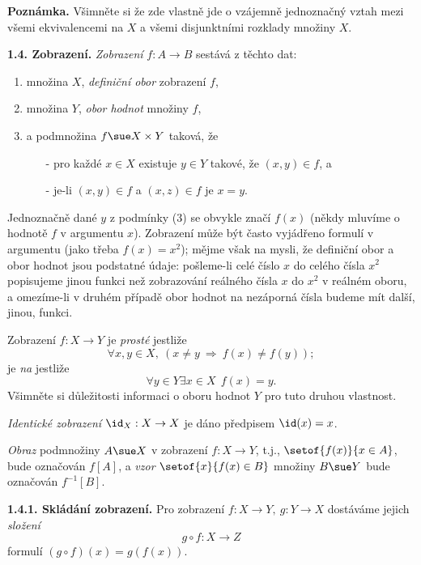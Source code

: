 \documentclass[12pt]{article}
\begin{document}
 \medskip
 
 {\bf  Poznámka.} Všimněte si že zde vlastně jde o vzájemně jednoznačný vztah mezi všemi ekvivalencemi na  $X$ a všemi disjunktními rozklady množiny $X$.
 
 
 
 \bigskip
 
 {\bf 1.4. Zobrazení.}  {\em  Zobrazení} $f:A\to B$ sestává z těchto dat:
 \begin{enumerate}
 \item množina $X$,  {\em definiční obor} zobrazení $f$,
 \item množina $Y$,  {\em obor hodnot} množiny $f$,
 \item a podmnožina $f\sue X\times Y$ taková, že
  \begin{itemize}
  \item[-] pro každé $x\in X$ existuje $y\in Y$ takové, že $(x,y)\in f$, a
  \item[-] je-li $(x,y)\in f$ a $(x,z)\in f$ je $x=y$.
  \end{itemize}
\end{enumerate}  
Jednoznačně dané $y$ z podmínky (3) se obvykle značí $f(x)$ (někdy mluvíme o hodnotě  $f$ v argumentu $x$). Zobrazení může být často vyjádřeno formulí v argumentu (jako třeba $f(x)=x^2$); mějme však na mysli, že definiční obor a obor hodnot jsou podstatné údaje: pošleme-li celé číslo $x$ do celého čísla $x^2$ popisujeme jinou funkci než zobrazování reálného čísla $x$ do $x^2$ v reálném oboru, a omezíme-li v druhém případě obor hodnot na nezáporná čísla budeme mít další, jinou, funkci.

Zobrazení $f:X\to Y$ je {\em prosté} jestliže
$$
\forall x,y\in X, \  (x\neq y\ \Rightarrow\ f(x)\neq f(y));
$$
je {\em na} jestliže
$$
\forall y\in Y \exists x\in X\ \ f(x)=y.
$$
Všimněte si důležitosti informaci o oboru hodnot $Y$ pro tuto druhou vlastnost.

 {\em Identické zobrazení} $\id_X:X\to X$ je dáno předpisem $\id(x)=x$.

\smallskip

 {\em Obraz} podmnožiny $A\sue X$ v zobrazení $f:X\to Y$, t.j., $\setof{f(x)}{x\in A}$, bude označován $f[A]$, 
a {\em vzor} $\setof{x}{f(x)\in B}$ množiny $B\sue Y$ bude označován $f^{-1}[B]$.

\medskip

{\bf 1.4.1. Skládání zobrazení.} Pro zobrazení
$
f:X\to Y, \ g:Y\to X
$
dostáváme jejich  {\em složení}
$$
g\circ f:X\to Z
$$
 formulí $(g\circ f)(x)=g(f(x))$.
\end{document}
